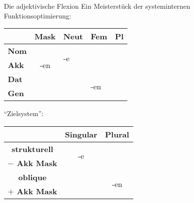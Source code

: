 \begin{frame}
  {Die adjektivische Flexion}
  \pause
  Ein Meisterstück der systeminternen Funktionsoptimierung:\\
  \Zeile
  \pause
  \begin{center}
    \begin{tabular}{|l|llll|}
      \cline{2-5}
      \multicolumn{1}{c|}{}& \textbf{Mask} & \textbf{Neut} & \textbf{Fem} & \textbf{Pl} \\
      \hline
      \textbf{Nom} && \multirow{2}{*}{-e} & \multicolumn{1}{c|}{} & \\ \cline{2-2}
      \textbf{Akk} & \multicolumn{1}{c|}{-en} && \multicolumn{1}{c|}{} & \\ \cline{2-4}
      \textbf{Dat} &&& \multirow{2}{*}{-en} & \\
      \textbf{Gen} &&&& \\
      \hline
    \end{tabular}
  \end{center}
  \pause
  "`Zielsystem"':\\
  \begin{center}
    \begin{tabular}{|l|c|c|}
      \cline{2-3}
      \multicolumn{1}{c|}{} & \multicolumn{1}{c|}{\textbf{Singular}} & \multicolumn{1}{c|}{\textbf{Plural}} \\
      \hline
      \multicolumn{1}{|c|}{\textbf{strukturell}} & \multirow{2}{*}{-e} &  \\
      \multicolumn{1}{|c|}{\textbf{$-$ Akk Mask}} &  &  \\
      \cline{1-2}
      \multicolumn{1}{|c|}{\textbf{oblique}} & \multicolumn{1}{c}{} & \multirow{2}{*}{-en} \\
      \multicolumn{1}{|c|}{\textbf{$+$ Akk Mask}} & \multicolumn{1}{c}{} & \\
      \hline
    \end{tabular}
  \end{center}
\end{frame}



